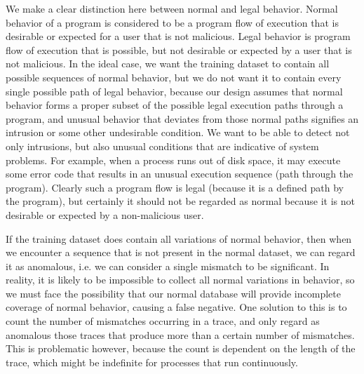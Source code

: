 \documentclass{report}
\begin{document}
\begin{spacing}{1.5}
{\large
\noindent We make a clear distinction here between normal and legal behavior. Normal behavior of a program is considered to be a program flow of execution that is desirable or expected for a user that is not malicious. Legal behavior is program flow of execution that is possible, but not desirable or expected by a user that is not malicious. In the ideal case, we want the training dataset to contain all possible sequences of normal behavior, but we do not want it to contain every single possible path of legal behavior, because our design assumes that normal behavior forms a proper subset of the possible legal execution paths through a program, and unusual behavior that deviates from those normal paths signifies an intrusion or some other undesirable condition. We want to be able to detect not only intrusions, but also unusual conditions that are indicative of system problems. For example, when a process runs out of disk space, it may execute some error code that results in an unusual execution sequence (path through the program). Clearly such a program flow is legal (because it is a defined path by the program), but certainly it should not be regarded as normal because it is not desirable or expected by a non-malicious user.
\newline
}

{\large
\noindent If the training dataset does contain all variations of normal behavior, then when we encounter a sequence that is not present in the normal dataset, we can regard it as anomalous, i.e. we can consider a single mismatch to be significant. In reality, it is likely to be impossible to collect all normal variations in behavior, so we must face the possibility that our normal database will provide incomplete coverage of normal behavior, causing a false negative. One solution to this is to count the number of mismatches occurring in a trace, and only regard as anomalous those traces that produce more than a certain number of mismatches. This is problematic however, because the count is dependent on the length of the trace, which might be indefinite for processes that run continuously.
\newline
}









































\end{spacing}
\end{document}
